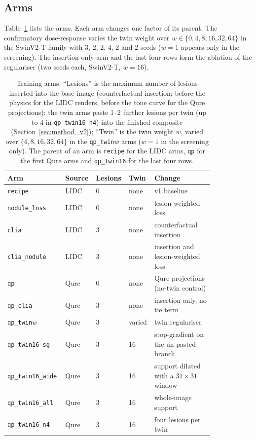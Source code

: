\subsection{Arms}
Table~\ref{tab:arms} lists the arms. Each arm changes one factor of its parent. The confirmatory dose-response varies the twin weight over
$w\in\{0,4,8,16,32,64\}$ in the SwinV2-T family with 3, 2, 2, 4, 2 and 2 seeds ($w=1$ appears only in the screening). The insertion-only arm and the
last four rows form the ablation of the regulariser (two seeds each, SwinV2-T, $w=16$).

\begin{table}[htbp]
\centering\small
\renewcommand{\arraystretch}{1.15}
\caption{Training arms. ``Lesions'' is the maximum number of lesions inserted into the base image (counterfactual insertion; before the physics
for the LIDC renders, before the tone curve for the Qure projections); the twin arms paste 1--2 further lesions per twin (up to 4 in
\texttt{qp\_twin16\_n4}) into the finished composite (Section~\ref{sec:method_v2});
``Twin'' is the twin weight $w$, varied over $\{4,8,16,32,64\}$ in the \texttt{qp\_twin}$w$ arms ($w=1$ in the screening only). The parent of an arm is \texttt{recipe} for the
LIDC arms, \texttt{qp} for the first Qure arms and \texttt{qp\_twin16} for the last four rows.}
\label{tab:arms}
\begin{tabular}{@{}p{0.27\linewidth}p{0.09\linewidth}p{0.10\linewidth}p{0.09\linewidth}p{0.28\linewidth}@{}}
\toprule
Arm & Source & Lesions & Twin & Change \\
\midrule
\texttt{recipe} & LIDC & 0 & none & v1 baseline \\
\texttt{nodule\_loss} & LIDC & 0 & none & lesion-weighted loss \\
\texttt{clia} & LIDC & 3 & none & counterfactual insertion \\
\texttt{clia\_nodule} & LIDC & 3 & none & insertion and lesion-weighted loss \\
\texttt{qp} & Qure & 0 & none & Qure projections (no-twin control) \\
\texttt{qp\_clia} & Qure & 3 & none & insertion only, no tie term \\
\texttt{qp\_twin}$w$ & Qure & 3 & varied & twin regulariser \\
\texttt{qp\_twin16\_sg} & Qure & 3 & 16 & stop-gradient on the un-pasted branch \\
\texttt{qp\_twin16\_wide} & Qure & 3 & 16 & support dilated with a $31\times31$ window \\
\texttt{qp\_twin16\_all} & Qure & 3 & 16 & whole-image support \\
\texttt{qp\_twin16\_n4} & Qure & 3 & 16 & four lesions per twin \\
\bottomrule
\end{tabular}
\end{table}

